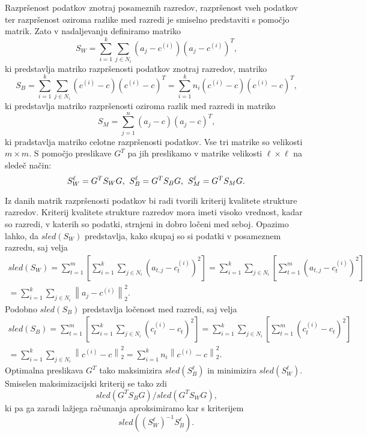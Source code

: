 \documentclass[mat1]{article}
\newcommand{\norm}[1]{\left\lVert#1\right\rVert}
\theoremstyle{definition}
\begin{document}
Razpršenost podatkov znotraj posameznih razredov, razpršenost vseh podatkov ter razpršenost oziroma razlike med razredi je smiselno predstaviti s pomočjo matrik. Zato v nadaljevanju definiramo matriko
$$S_W = \sum_{i = 1}^{k} \sum_{j \in N_i}(a_j - c^{(i)})(a_j - c^{(i)})^T\text{,}$$
ki predstavlja matriko razpršenosti podatkov znotraj razredov, matriko
$$S_B = \sum_{i = 1}^{k} \sum_{j \in N_i} ( c^{(i)} - c)( c^{(i)} - c)^T = \sum_{i = 1}^{k} n_i ( c^{(i)} - c)( c^{(i)} - c)^T \text{,}$$
ki predstavlja matriko razpršenosti oziroma razlik med razredi in matriko
$$S_M = \sum_{j = 1}^{n} (a_j - c)(a_j - c)^T \text{,}$$
ki pradstavlja matriko celotne razpršenosti podatkov. Vse tri matrike so velikosti $m \times m$.
S pomočjo preslikave $G^T$ pa jih preslikamo v matrike velikosti $\ell \times \ell$ na sledeč način:
$$ S_{W}^{\ell} = G^T S_W G \text{,} \hspace{2mm} S_{B}^{\ell} = G^T S_B G \text{,} \hspace{2mm} S_{M}^{\ell} = G^T S_M G \text{.}
$$

Iz danih matrik razpršenosti podatkov bi radi tvorili kriterij kvalitete strukture razredov. Kriterij kvalitete strukture razredov mora imeti visoko vrednost, kadar so razredi, v katerih so podatki, strnjeni in dobro ločeni med seboj. Opazimo lahko, da $sled(S_W)$ predstavlja, kako skupaj so si podatki v posameznem razredu, saj velja
\begin{gather*} 
sled(S_W) = \sum_{t=1}^{m} \left[ \sum_{i = 1}^{k} \sum_{j \in N_i}(a_{t, j} - c_t^{(i)})^2 \right]
= \sum_{i = 1}^{k} \sum_{j \in N_i} \left[ \sum_{t=1}^{m} (a_{t, j} - c_t^{(i)})^2 \right] \\
= \sum_{i = 1}^{k} \sum_{j \in N_i} \norm{ a_j - c^{(i)}}_2^2 \text{.}
\end{gather*}
Podobno $sled(S_B)$ predstavlja ločenost med razredi, saj velja
\begin{gather*} 
sled(S_B) = \sum_{t=1}^{m} \left[ \sum_{i = 1}^{k} \sum_{j \in N_i}(c_t^{(i)} - c_t)^2\right]
= \sum_{i = 1}^{k} \sum_{j \in N_i} \left[ \sum_{t=1}^{m} (c_t^{(i)} - c_t)^2 \right] \\
= \sum_{i = 1}^{k} \sum_{j \in N_i} \norm{ c^{(i)} - c}_2^2 
= \sum_{i = 1}^{k} n_i \norm{ c^{(i)} - c}_2^2
\text{.}
\end{gather*}
Optimalna preslikava $G^T$ tako maksimizira $sled(S_{B}^{\ell})$ in minimizira $sled(S_{W}^{\ell})$. Smiselen maksimizacijski kriterij se tako zdi $$sled( G^T S_B G) / sled( G^T S_W G) \text{,}$$ ki pa ga zaradi lažjega računanja aproksimiramo kar s kriterijem $$sled((S_W^\ell)^{-1}S_B^\ell) \text{.}$$
\end{document}
